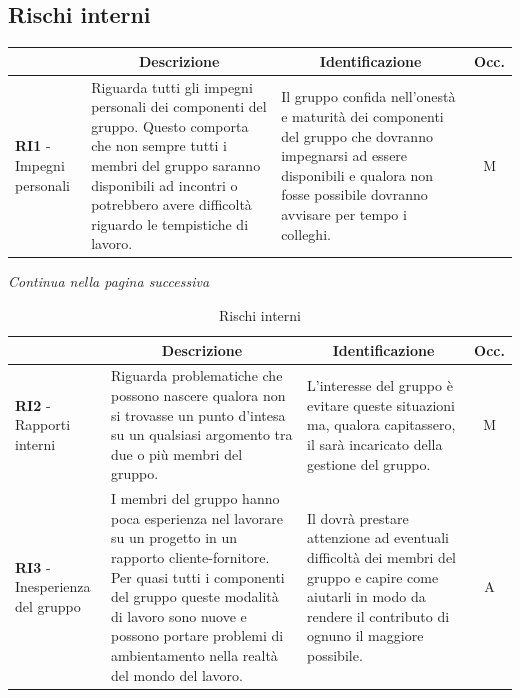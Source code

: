 \subsection{Rischi interni} \label{subsection:rischi_interni}
\begin{table}[H]
  \centering
  \renewcommand{\arraystretch}{1.8}
  \begin{tabular}{p{5.5cm}|p{5cm}|p{5cm}|c}
    \rowcolor[HTML]{125E28} 
    \multicolumn{1}{c}{\color[HTML]{FFFFFF}\textbf{Codice}}
    & \multicolumn{1}{c}{\color[HTML]{FFFFFF}\textbf{Descrizione}}
    & \multicolumn{1}{c}{\color[HTML]{FFFFFF}\textbf{Identificazione}}
    & \color[HTML]{FFFFFF}\textbf{Occ.}\\
    \hline
    \textbf{RI1} - Impegni personali & Riguarda tutti gli impegni personali dei componenti del gruppo. Questo comporta che non sempre tutti i membri del gruppo saranno disponibili ad incontri o potrebbero avere difficoltà riguardo le tempistiche di lavoro. & Il gruppo confida nell'onestà e maturità dei componenti del gruppo che dovranno impegnarsi ad essere disponibili e qualora non fosse possibile dovranno avvisare per tempo i colleghi. & M \\
  \end{tabular}
\end{table}
\begin{center}
  \textit{\small Continua nella pagina successiva}
\end{center}
\begin{table}[H]
  \centering
  \renewcommand{\arraystretch}{1.8}
  \begin{tabular}{p{5.5cm}|p{5cm}|p{5cm}|c}
    \rowcolor[HTML]{125E28} 
    \multicolumn{1}{c}{\color[HTML]{FFFFFF}\textbf{Codice}}
    & \multicolumn{1}{c}{\color[HTML]{FFFFFF}\textbf{Descrizione}}
    & \multicolumn{1}{c}{\color[HTML]{FFFFFF}\textbf{Identificazione}}
    & \color[HTML]{FFFFFF}\textbf{Occ.}\\
    \hline
    \textbf{RI2} - Rapporti interni & Riguarda problematiche che possono nascere qualora non si trovasse un punto d'intesa su un qualsiasi argomento tra due o più membri del gruppo. & L'interesse del gruppo è evitare queste situazioni ma, qualora capitassero, il \roleProjectManagerLow{} sarà incaricato della gestione del gruppo. & M \\
    \textbf{RI3} - Inesperienza del gruppo & I membri del gruppo hanno poca esperienza nel lavorare su un progetto in un rapporto cliente-fornitore. Per quasi tutti i componenti del gruppo queste modalità di lavoro sono nuove e possono portare problemi di ambientamento nella realtà del mondo del lavoro. & Il \roleProjectManagerLow{} dovrà prestare attenzione ad eventuali difficoltà dei membri del gruppo e capire come aiutarli in modo da rendere il contributo di ognuno il maggiore possibile. & A \\
  \end{tabular}
  \caption{Rischi interni}
\end{table}

